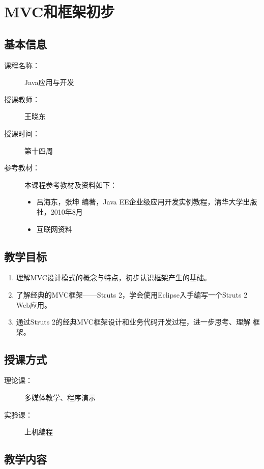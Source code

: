 \chapter{MVC和框架初步}
\label{chp:Java-MVC-and-framework}

\section*{基本信息}
\sline
\begin{description}
\item[课程名称：] Java应用与开发
\item[授课教师：] 王晓东
\item[授课时间：] 第十四周
\item[参考教材：] 本课程参考教材及资料如下：
  \begin{itemize}
  \item 吕海东，张坤 编著，Java EE企业级应用开发实例教程，清华大学出版社，2010年8月
  \item 互联网资料
  \end{itemize}
\end{description}

\section*{教学目标}

\sline

\begin{enumerate}
\item 理解MVC设计模式的概念与特点，初步认识框架产生的基础。
\item 了解经典的MVC框架——Struts 2，学会使用Eclipse入手编写一个Struts 2
  Web应用。
\item 通过Struts 2的经典MVC框架设计和业务代码开发过程，进一步思考、理解
  框架。
\end{enumerate}  

\section*{授课方式}

\sline
\begin{description}
\item[理论课：] 多媒体教学、程序演示
\item[实验课：] 上机编程
\end{description}

\newpage
\section*{教学内容}
\sline


